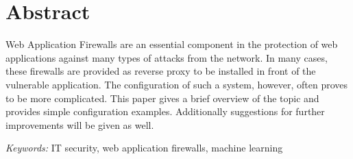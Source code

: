
\section*{Abstract}
Web Application Firewalls are an essential component in the protection of web applications against many types of attacks from the network. In many cases, these firewalls are provided as reverse proxy to be installed in front of the vulnerable application. The configuration of such a
system, however, often proves to be more complicated. This paper gives a brief overview of the topic and provides simple configuration examples. Additionally suggestions for further improvements will be given as well.

\emph{Keywords:} IT security, web application firewalls, machine learning



